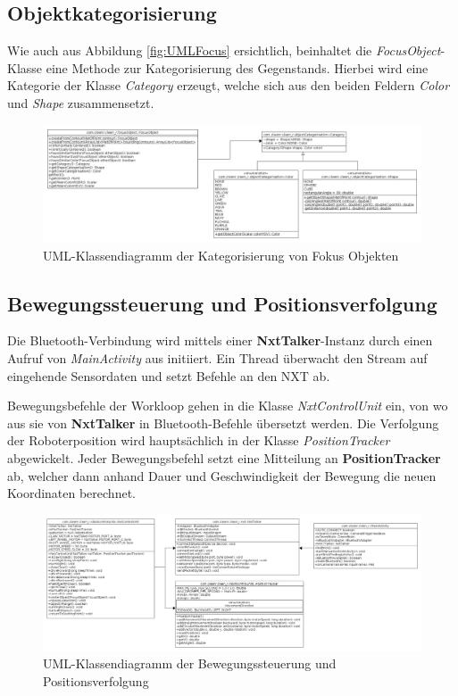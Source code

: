 \subsection{Objektkategorisierung}

Wie auch aus Abbildung \ref{fig:UMLFocus} ersichtlich, beinhaltet die \textit{FocusObject}-Klasse eine Methode zur Kategorisierung des Gegenstands. Hierbei wird eine Kategorie der Klasse \textit{Category} erzeugt, welche sich aus den beiden Feldern \textit{Color} und \textit{Shape} zusammensetzt.

\begin{figure}[h]
\centering
\includegraphics[width=\textwidth]{Bilder/Software/UML/Categories}
\caption{UML-Klassendiagramm der Kategorisierung von Fokus Objekten}
\label{fig:UMLCategorisation}
\end{figure}

\subsection{Bewegungssteuerung und Positionsverfolgung}

Die Bluetooth-Verbindung wird mittels einer \textbf{NxtTalker}-Instanz durch einen Aufruf von \textit{MainActivity} aus initiiert. Ein Thread überwacht den Stream auf eingehende Sensordaten und setzt Befehle an den NXT ab.

Bewegungsbefehle der Workloop gehen in die Klasse \textit{NxtControlUnit} ein, von wo aus sie von \textbf{NxtTalker} in Bluetooth-Befehle übersetzt werden. Die Verfolgung der Roboterposition wird hauptsächlich in der Klasse \textit{PositionTracker} abgewickelt. Jeder Bewegungsbefehl setzt eine Mitteilung an \textbf{PositionTracker} ab, welcher dann anhand Dauer und Geschwindigkeit der Bewegung die neuen Koordinaten berechnet.

\begin{figure}[h]
\centering
\includegraphics[width=\textwidth]{Bilder/Software/UML/Movement}
\caption{UML-Klassendiagramm der Bewegungssteuerung und Positionsverfolgung}
\label{fig:UMLMovement}
\end{figure}

